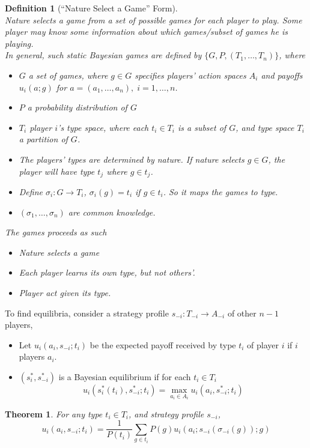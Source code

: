 \documentclass[12pt]{article}
\newtheorem{definition}{Definition}[section]
\newtheorem{theorem}{Theorem}[section]
\theoremstyle{definition}
\begin{document}
\begin{definition}[``Nature Select a Game'' Form]
\hfill\\\normalfont Nature selects a game from a set of possible games for each player to play. Some player may know some information about which games/subset of games he is playing.\\
In general, such static Bayesian games are defined by $\{G,P,(T_1,\ldots, T_n)\}$, where
\begin{itemize}
  \item $G$ a set of games, where $g\in G$ specifies players' action spaces $A_i$ and payoffs $u_i(a;g)$ for $a=(a_1,\ldots, a_n), \;i=1,\ldots, n$.
  \item $P$ a probability distribution of $G$
  \item $T_i$ player $i$'s type space, where each $t_i\in T_i$ is a subset of $G$, and type space $T_i$ a partition of $G$.
  \item The players' types are determined by nature. If nature selects $g\in G$, the player will have type $t_j$ where $g\in t_j$.
  \item Define $\sigma_i:G\to T_i$, $\sigma_i(g)=t_i$ if $g\in t_i$. So it maps the games to type.
  \item $(\sigma_1,\ldots, \sigma_n)$ are common knowledge.
\end{itemize}
The games proceeds as such
\begin{itemize}
  \item Nature selects a game
  \item Each player learns its own type, but not others'.
  \item Player act given its type.
\end{itemize}
\end{definition}
To find equilibria, consider a strategy profile $s_{-i}:T_{-i}\to A_{-i}$ of other $n-1$ players,
\begin{itemize}
  \item Let $u_i(a_i,s_{-i}; t_i)$ be the expected payoff received by type $t_i$ of player $i$ if $i$ players $a_i$.
  \item $(s_i^\ast, s_{-i}^\ast)$ is a Bayesian equilibrium if for each $t_i\in T_i$
  \[
u_i(s_i^\ast(t_i), s_{-i}^\ast; t_i) = \max_{a_i\in A_i} u_i(a_i, s_{-i}^\ast; t_i)
  \]
\end{itemize}
\begin{theorem}\normalfont For any type $t_i\in T_i$, and strategy profile $s_{-i}$, 
\[
u_i(a_i,s_{-i}; t_i) =\frac{1}{P(t_i)}\sum_{g\in t_i}P(g)u_i(a_i; s_{-i}(\sigma_{-i}(g));g)
\]
\end{theorem}
\end{document}
